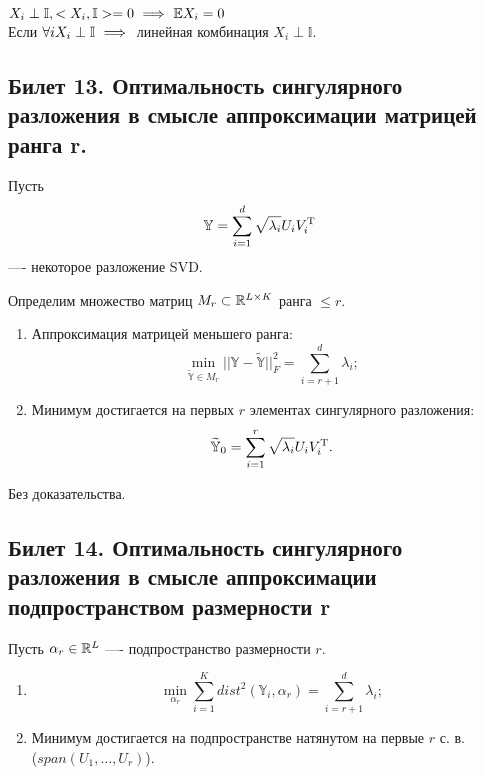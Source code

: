 $X_i \perp \mathbb{I}, < X_i, \mathbb{I} > = 0 \ \Longrightarrow \  \mathbb{E}X_i = 0$\\
Если $\forall i X_i \perp \mathbb{I} \ \Longrightarrow \ $ линейная комбинация $X_i \perp \mathbb{I}$.

\subsection{ Билет 13. Оптимальность сингулярного разложения в смысле аппроксимации матрицей ранга r.}

Пусть \[\mathbb{Y} = \sum_{i=1}^{d}\sqrt{\lambda_i}U_iV_i^{\rm T}\] —- некоторое разложение SVD.

Определим множество матриц $M_r\subset \mathbb{R}^{L\times K}$ ранга $\leq r$.

\begin{sug}

\begin{enumerate}
\item Аппроксимация матрицей меньшего ранга: $$\min_{\mathbb {\widetilde{Y}}\in M_r} ||\mathbb{Y}-\mathbb{\widetilde{Y}}||_F^2=\sum_{i=r+1}^{d}\lambda_i; $$
\item Минимум достигается на первых $r$ элементах сингулярного разложения:
\[\mathbb{\widetilde{Y}}_0=\sum_{i=1}^{r} \sqrt{\lambda_i}U_iV_i^{\rm T}.\]
\end{enumerate}
\end{sug}

Без доказательства. 

\subsection{ Билет 14. Оптимальность сингулярного разложения в смысле аппроксимации подпространством размерности r}

Пусть $\alpha_r \in \mathbb{R}^{L}$ —- подпространство размерности $r$.

\begin{sug}

\begin{enumerate}
\item $$\min_{\alpha_r} \sum_{i=1}^{K}dist^2(\mathbb{Y}_i,\alpha_r)=\sum_{i=r+1}^{d}\lambda_i; $$
\item Минимум достигается на подпространстве натянутом на первые $r$ с. в. \\ ($span(U_1,\ldots , U_r)$).
\end{enumerate}
\end{sug}
